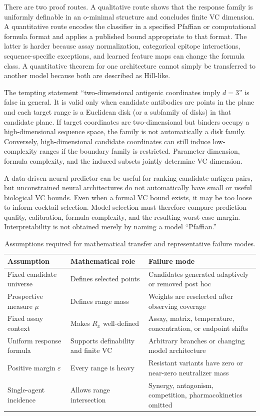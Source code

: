 \documentclass[11pt,a4paper]{article}
\newcommand{\eps}{\varepsilon}
\begin{document}
There are two proof routes. A qualitative route shows that the response family is uniformly definable in an o-minimal structure and concludes finite VC dimension. A quantitative route encodes the classifier in a specified Pfaffian or computational formula format and applies a published bound appropriate to that format. The latter is harder because assay normalization, categorical epitope interactions, sequence-specific exceptions, and learned feature maps can change the formula class. A quantitative theorem for one architecture cannot simply be transferred to another model because both are described as Hill-like.

The tempting statement “two-dimensional antigenic coordinates imply $d=3$” is false in general. It is valid only when candidate antibodies are points in the plane and each target range is a Euclidean disk (or a subfamily of disks) in that candidate plane. If target coordinates are two-dimensional but binders occupy a high-dimensional sequence space, the family is not automatically a disk family. Conversely, high-dimensional candidate coordinates can still induce low-complexity ranges if the boundary family is restricted. Parameter dimension, formula complexity, and the induced subsets jointly determine VC dimension.

A data-driven neural predictor can be useful for ranking candidate-antigen pairs, but unconstrained neural architectures do not automatically have small or useful biological VC bounds. Even when a formal VC bound exists, it may be too loose to inform cocktail selection. Model selection must therefore compare prediction quality, calibration, formula complexity, and the resulting worst-case margin. Interpretability is not obtained merely by naming a model “Pfaffian.”

\begin{table}[t]\centering\small\caption{Assumptions required for mathematical transfer and representative failure modes.}\begin{tabularx}{\linewidth}{p{.19\linewidth}p{.35\linewidth}X}\toprule Assumption&Mathematical role&Failure mode\\\midrule Fixed candidate universe&Defines selected points&Candidates generated adaptively or removed post hoc\\ Prospective measure $\mu$&Defines range mass&Weights are reselected after observing coverage\\ Fixed assay context&Makes $R_x$ well-defined&Assay, matrix, temperature, concentration, or endpoint shifts\\ Uniform response formula&Supports definability and finite VC&Arbitrary branches or changing model architecture\\ Positive margin $\eps$&Every range is heavy&Resistant variants have zero or near-zero neutralizer mass\\ Single-agent incidence&Allows range intersection&Synergy, antagonism, competition, pharmacokinetics omitted\\\bottomrule\end{tabularx}\label{tab:assumptions}\end{table}
\end{document}
